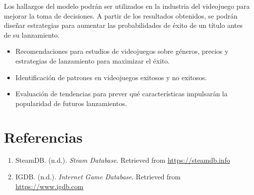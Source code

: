 \documentclass[titlepage,a4paper]{article}
\begin{document}
Los hallazgos del modelo podrán ser utilizados en la industria del videojuego para mejorar la toma de decisiones. A partir de los resultados obtenidos, se podrán diseñar estrategias para aumentar las probabilidades de éxito de un título antes de su lanzamiento. \\

\begin{itemize}
    \item Recomendaciones para estudios de videojuegos sobre géneros, precios y estrategias de lanzamiento para maximizar el éxito. \\

    \item Identificación de patrones en videojuegos exitosos y no exitosos. \\

    \item  Evaluación de tendencias para prever qué características impulsarán la popularidad de futuros lanzamientos. \\
\end{itemize}

\vspace{0.5cm}


\section{Referencias}

\begin{enumerate}

    \item SteamDB. (n.d.). \textit{Steam Database}. Retrieved from \url{https://steamdb.info}


    \item IGDB. (n.d.). \textit{Internet Game Database}. Retrieved from \url{https://www.igdb.com}

\end{enumerate}
\end{document}
